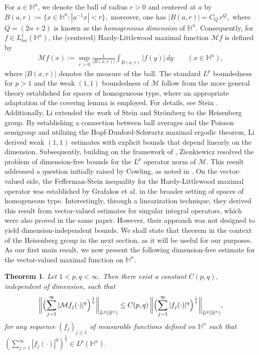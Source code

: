 \documentclass[11pt]{amsart}
\newcommand{\Ha}{\mathbb{H}^n}
\newtheorem{theorem}{Theorem}[section]
\theoremstyle{definition}
\numberwithin{equation}{section}
\begin{document}
 For $a\in \Ha$,  we denote the ball of radius $r>0$ and centered at $a$ by  $B(a, r):=\{x\in \Ha: |a^{-1} x|<r\},$ moreover, one has $|B(a,r)| = C_{Q} \, r^{Q},$ where $Q=(2n + 2)$ is known as the \textit{homogeneous dimension} of $\Ha$. Consequently, for $f\in L^1_{loc}(\Ha)$, the (centered) Hardy-Littlewood maximal function $\mathcal{M}f$ is defined by 
\begin{align}
\mathcal{M}f(x):=\sup_{r>0}\frac{1}{|B(x, r)|}\int_{B(x, r)} |f(y)|\, dy\quad\quad(x\in \Ha),   
\end{align}
where $|B(x, r)|$ denotes the measure of the ball. The standard $L^p$ boundedness for $p > 1$ and the weak $(1,1)$ boundedness of $\mathcal{M}$ follow from the more general theory established for spaces of homogeneous type, where an appropriate adaptation of the covering lemma is employed. For details, see Stein \cite{SteinBook}. Additionally, Li \cite{HQLi-Heisenberg} extended the work of Stein and Strömberg \cite{SS} to the Heisenberg group. By establishing a connection between ball averages and the Poisson semigroup and utilizing the Hopf-Dunford-Schwartz maximal ergodic theorem, Li derived weak $(1,1)$ estimates with explicit bounds that depend linearly on the dimension. Subsequently, building on the framework of \cite{SS}, Zienkiewicz \cite{Z} resolved the problem of dimension-free bounds for the $L^p$ operator norm of $\mathcal{M}$. This result addressed a question initially raised by Cowling, as noted in \cite{Z}.  On the vector-valued side, the Fefferman-Stein inequality for the Hardy-Littlewood maximal operator was established by Grafakos et al. \cite{Gra-Scand} in the broader setting of spaces of homogeneous type. Interestingly, through a linearization technique, they derived this result from vector-valued estimates for singular integral operators, which were also proved in the same paper. However, their approach was not designed to yield dimension-independent bounds. We shall state that theorem in the context of the Heisenberg group in the next section, as it will be useful for our purposes. As our first main result, we now present the following dimension-free estimate for the vector-valued maximal function on $\Ha$. 
\begin{theorem}
\label{Main-thm}
Let $1<p, q<\infty.$ Then there exist a constant $C(p, q),$ independent of dimension, such that
\[
\biggl\|\Bigl(\sum_{j=1}^{\infty}|\mathcal{M}f_j(\cdot)|^q\Bigr)^\frac{1}{q}\biggr\|_{L^p(\Ha)}\leq C(p, q)\, \biggl\|\Bigl(\sum_{j=1}^{\infty}|f_j(\cdot)|^q\Bigr)^\frac{1}{q}\biggr\|_{L^p(\Ha)},
\]
for any  sequence $(f_j)_{j\geq 1}$  of measurable functions defined on $\mathbb{H}^n$ such that $\left(\sum_{j=1}^\infty|f_j(\cdot)|^q\right)^{\frac1q}\in L^p(\mathbb{H}^n).$
\end{theorem}
\end{document}
